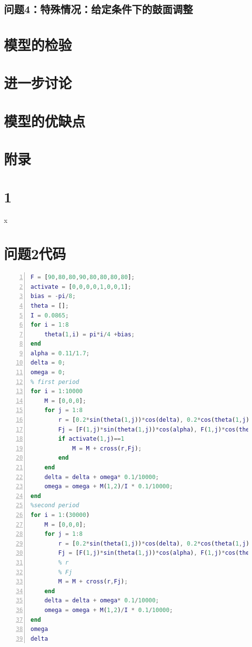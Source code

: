 \documentclass[nocover]{cumcmart}%
\begin{document}
\subsection{问题4：特殊情况：给定条件下的鼓面调整}


\section{模型的检验}
\section{进一步讨论}
\section{模型的优缺点}











\newpage
\appendix
\section*{附录}
\begin{appendix}
\section{1}
x
\section{问题2代码}
\lstset{breaklines}
\begin{lstlisting}[language=Matlab,numbers=left, numberstyle=\tiny,keywordstyle=\color{blue!70},commentstyle=\color{red!50!green!50!blue!50},frame=shadowbox, rulesepcolor=\color{red!20!green!20!blue!20}] 
% 以对称轴为y轴，则各个力位于(4i/pi + bias)的位置
F = [90,80,80,90,80,80,80,80];
activate = [0,0,0,0,1,0,0,1];
bias = -pi/8;
theta = [];
I = 0.0865;
for i = 1:8
    theta(1,i) = pi*i/4 +bias;
end
alpha = 0.11/1.7;
delta = 0;
omega = 0;
% first period
for i = 1:10000
    M = [0,0,0];
    for j = 1:8
        r = [0.2*sin(theta(1,j))*cos(delta), 0.2*cos(theta(1,j))*cos(delta),0.2*sin(delta)];
        Fj = [F(1,j)*sin(theta(1,j))*cos(alpha), F(1,j)*cos(theta(1,j))*cos(alpha), F(1,j)*sin(alpha)];
        if activate(1,j)==1
            M = M + cross(r,Fj);   
        end
    end
    delta = delta + omega* 0.1/10000;
    omega = omega + M(1,2)/I * 0.1/10000;
end
%second period
for i = 1:(30000)
    M = [0,0,0];
    for j = 1:8
        r = [0.2*sin(theta(1,j))*cos(delta), 0.2*cos(theta(1,j))*cos(delta),0.2*sin(delta)];
        Fj = [F(1,j)*sin(theta(1,j))*cos(alpha), F(1,j)*cos(theta(1,j))*cos(alpha), F(1,j)*sin(alpha)];
        % r
        % Fj
        M = M + cross(r,Fj); 
    end
    delta = delta + omega* 0.1/10000;
    omega = omega + M(1,2)/I * 0.1/10000;
end
omega
delta
\end{lstlisting}
\end{appendix}
\end{document}
